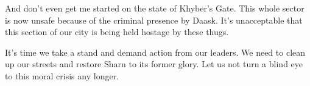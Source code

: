 \documentclass{article}
\begin{document}
\begin{multicols}{3}
And don't even get me started on the state of Khyber's Gate. This whole sector is now unsafe because of the criminal presence by Daask. It's unacceptable that this section of our city is being held hostage by these thugs.

It's time we take a stand and demand action from our leaders. We need to clean up our streets and restore Sharn to its former glory. Let us not turn a blind eye to this moral crisis any longer.

    \closearticle

\end{multicols}
\end{document}
